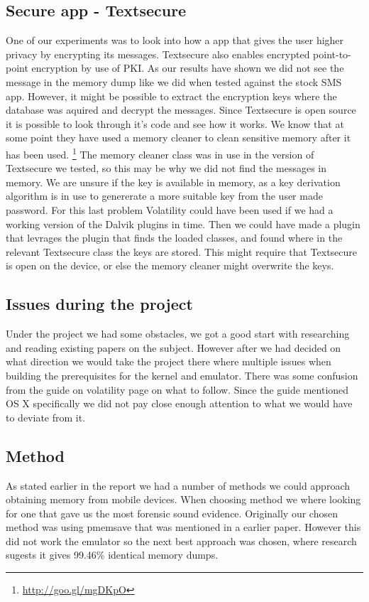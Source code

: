 \subsection{Secure app - Textsecure}
One of our experiments was to look into how a app that gives the user higher 
privacy by encrypting its messages. Textsecure also enables encrypted point-to-
point encryption by use of PKI. As our results have shown we did not see the 
message in the memory dump like we did when tested against the stock SMS app. 
However, it might be possible to extract the encryption keys where the database was 
aquired and decrypt the messages. Since Textsecure is open source it is
possible to look through it's code and see how it works. We know that at some
point they have used a memory cleaner to clean sensitive memory after it has
been used.
\footnote{\url{http://goo.gl/mgDKpO}} 
The memory cleaner class was in use in the version of Textsecure we tested, so
this may be why we did not find the messages in memory. We are unsure if the
key is available in memory, as a key derivation algorithm is in use to
genererate a more suitable key from the user made password. For this last
problem Volatility could have been used if we had a working version of the
Dalvik plugins in time. Then we could have made a plugin that levrages the
plugin that finds the loaded classes, and found where in the relevant
Textsecure class the keys are stored. This might require that Textsecure is
open on the device, or else the memory cleaner might overwrite the keys.

\subsection{Issues during the project}
Under the project we had some obstacles, we got a good start with researching and 
reading existing papers on the subject. However after we had decided on what 
direction we would take the project there where multiple issues when building the 
prerequisites for the kernel and emulator. There was some confusion from the guide 
on volatility page on what to follow. Since the guide mentioned OS X specifically 
we did not pay close enough attention to what we would have to deviate from it.

\subsection{Method}
As stated earlier in the report we had a number of methods we could approach 
obtaining memory from mobile devices. When choosing method we where looking for one 
that gave us the most forensic sound evidence. Originally our chosen method was 
using pmemsave %
that was mentioned in a earlier paper\cite{acq_vol_android_mem}. However this did 
not work the emulator so the next best approach was chosen, where research sugests 
it gives 99.46\% identical memory dumps\cite{acq_vol_android_mem}.


